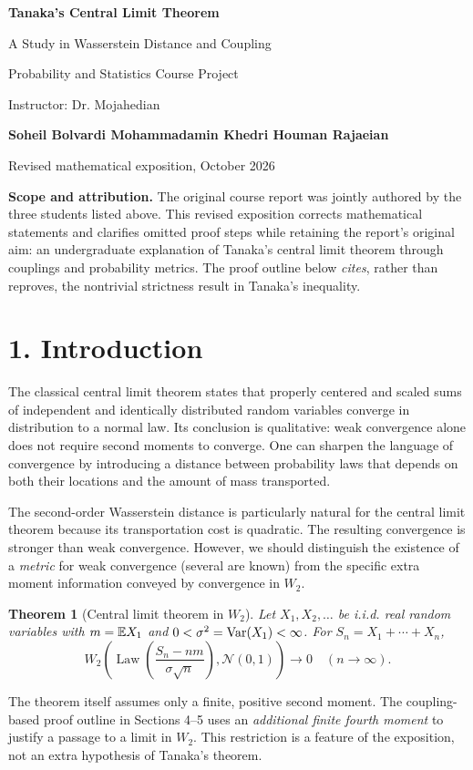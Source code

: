 \documentclass[10pt,a4paper]{article}
\newtheorem{theorem}{Theorem}\newtheorem{lemma}{Lemma}
\newcommand{\Law}{\operatorname{Law}}\newcommand{\N}{\mathcal N}
\newcommand{\W}{W_2}
\begin{document}
\begin{center}
{\Large\bfseries Tanaka's Central Limit Theorem}\par
{\large A Study in Wasserstein Distance and Coupling}\par
\vspace{10pt}
{\normalsize Probability and Statistics Course Project}\par
{\normalsize Instructor: Dr. Mojahedian}\par
\vspace{5pt}
{\bfseries Soheil Bolvardi \quad Mohammadamin Khedri \quad Houman Rajaeian}\par
\vspace{8pt}
{\small Revised mathematical exposition, October 2026}
\end{center}
\vspace{8pt}
\textbf{Scope and attribution.} The original course report was jointly authored by the three students listed above. This revised exposition corrects mathematical statements and clarifies omitted proof steps while retaining the report's original aim: an undergraduate explanation of Tanaka's central limit theorem through couplings and probability metrics. The proof outline below \emph{cites}, rather than reproves, the nontrivial strictness result in Tanaka's inequality.

\section*{1. Introduction}
The classical central limit theorem states that properly centered and scaled sums of independent and identically distributed random variables converge in distribution to a normal law. Its conclusion is qualitative: weak convergence alone does not require second moments to converge. One can sharpen the language of convergence by introducing a distance between probability laws that depends on both their locations and the amount of mass transported.

The second-order Wasserstein distance is particularly natural for the central limit theorem because its transportation cost is quadratic. The resulting convergence is stronger than weak convergence. However, we should distinguish the existence of a \emph{metric} for weak convergence (several are known) from the specific extra moment information conveyed by convergence in $W_2$.

\begin{theorem}[Central limit theorem in $W_2$]
Let $X_1,X_2,\ldots$ be i.i.d. real random variables with $m=\mathbb E X_1$ and $0<\sigma^2=\operatorname{Var}(X_1)<\infty$. For $S_n=X_1+\cdots+X_n$,
\[
\W\left(\Law\left(\frac{S_n-nm}{\sigma\sqrt n}\right),\N(0,1)\right)
\longrightarrow 0 \quad(n\to\infty).
\]
\end{theorem}
The theorem itself assumes only a finite, positive second moment. The coupling-based proof outline in Sections 4--5 uses an \emph{additional finite fourth moment} to justify a passage to a limit in $W_2$. This restriction is a feature of the exposition, not an extra hypothesis of Tanaka's theorem.
\end{document}
